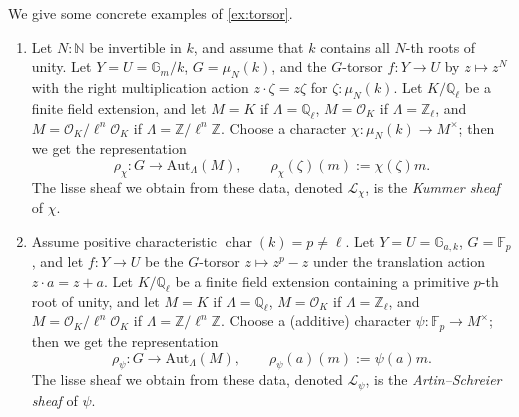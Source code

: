 \documentclass[11pt,letterpaper]{article}
\theoremstyle{numberfirstplain}
\numberwithin{equation}{theorem}
\theoremstyle{numberfirstupright}
\begin{document}
\begin{example}We give some concrete examples of \cref{ex:torsor}. 
  \begin{enumerate}
    \item Let $N:\mathbb N$ be invertible in $k$, and assume that $k$ contains all $N$-th roots of unity. 
    Let $Y=U=\mathbb G_m/k$, $G=\mu_N(k)$, and the $G$-torsor $f:Y\rightarrow U$ by $z\mapsto z^N$ with the right multiplication action $z\cdot\zeta=z\zeta$ for $\zeta:\mu_N(k)$. 
    Let $K/\mathbb Q_\ell$ be a finite field extension, and let $M=K$ if $\Lambda=\mathbb Q_\ell$, $M=\mathcal O_K$ if $\Lambda=\mathbb Z_\ell$, and $M=\mathcal O_K/\ell^n\mathcal O_K$ if $\Lambda=\mathbb Z/\ell^n\mathbb Z$. 
    Choose a character $\chi:\mu_N(k)\rightarrow M^\times$; then we get the representation
    $$\rho_\chi:G\rightarrow\mathrm{Aut}_\Lambda(M),\qquad \rho_\chi(\zeta)(m):=\chi(\zeta)m.$$
    The lisse sheaf we obtain from these data, denoted $\mathcal L_\chi$, is the \textit{Kummer sheaf} of $\chi$. 
    \item Assume positive characteristic $\operatorname{char}(k)=p\ne \ell$. Let $Y=U=\mathbb G_{a,k}$, $G=\mathbb F_p$, and let $f:Y\rightarrow U$ be the $G$-torsor $z\mapsto z^p-z$ under the translation action $z\cdot a=z+a$.
    Let $K/\mathbb Q_\ell$ be a finite field extension containing a primitive $p$-th root of unity, and let $M=K$ if $\Lambda=\mathbb Q_\ell$, $M=\mathcal O_K$ if $\Lambda=\mathbb Z_\ell$, and $M=\mathcal O_K/\ell^n\mathcal O_K$ if $\Lambda=\mathbb Z/\ell^n\mathbb Z$.
    Choose a (additive) character $\psi:\mathbb F_p\rightarrow M^\times$; then we get the representation
    $$\rho_\psi:G\rightarrow\mathrm{Aut}_\Lambda(M),\qquad \rho_\psi(a)(m):=\psi(a)m.$$
    The lisse sheaf we obtain from these data, denoted $\mathcal L_\psi$, is the \textit{Artin--Schreier sheaf} of $\psi$. 
  \end{enumerate}
\end{example}
\end{document}

